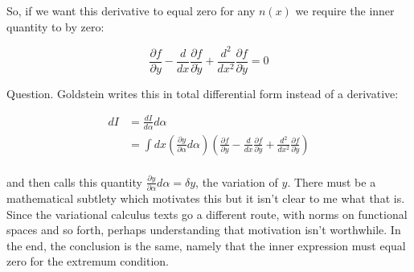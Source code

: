 \documentclass{article}
\newcommand{\ydot}[0]{\dot{y}}
\newcommand{\yddot}[0]{\ddot{y}}
\newcommand{\PD}[2]{\frac{\partial {#2}}{\partial {#1}}}
\begin{document}
So, if we want this derivative to equal zero for any $n(x)$ we require the inner quantity to by zero:

\begin{equation}
\PD{y}{f} - \frac{d}{ d x} \PD{\ydot}{f} + \frac{d^2}{dx^2} \PD{\yddot}{f} = 0
\end{equation}

Question.  Goldstein writes this in total differential form instead of a derivative:

\begin{align*}
dI &= \frac{dI}{d\alpha} d\alpha \\
&= \int d x \left(\PD{\alpha}{y} d \alpha\right) \left( \PD{y}{f} - \frac{d}{ d x} \PD{\ydot}{f} + \frac{d^2}{dx^2} \PD{\yddot}{f} \right) \\
\end{align*}

and then calls this quantity $\PD{\alpha}{y} d \alpha = \delta y$, the variation of $y$.  There must be a mathematical subtlety which motivates this
but it isn't clear to me what that is.  Since the variational calculus texts go a different route, with norms on functional spaces and so forth, perhaps
understanding that motivation isn't worthwhile.  In the end, the conclusion is the same, namely that the inner expression must equal zero for the extremum
condition.



\end{document}
